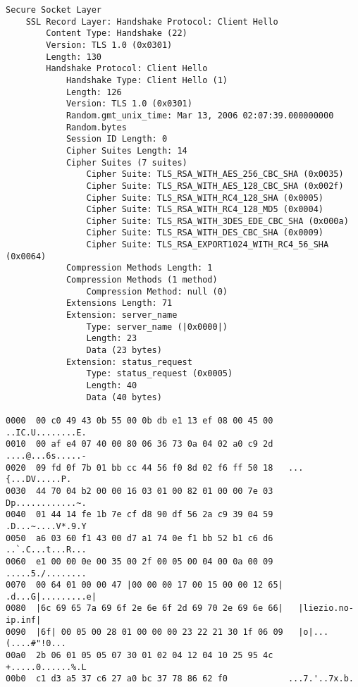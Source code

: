 \begin{lstlisting}[caption=Conexão oriunda do Opera -- Decodificação da mensagem \tlsHsCh]
Secure Socket Layer
    SSL Record Layer: Handshake Protocol: Client Hello
        Content Type: Handshake (22)
        Version: TLS 1.0 (0x0301)
        Length: 130
        Handshake Protocol: Client Hello
            Handshake Type: Client Hello (1)
            Length: 126
            Version: TLS 1.0 (0x0301)
            Random.gmt_unix_time: Mar 13, 2006 02:07:39.000000000
            Random.bytes
            Session ID Length: 0
            Cipher Suites Length: 14
            Cipher Suites (7 suites)
                Cipher Suite: TLS_RSA_WITH_AES_256_CBC_SHA (0x0035)
                Cipher Suite: TLS_RSA_WITH_AES_128_CBC_SHA (0x002f)
                Cipher Suite: TLS_RSA_WITH_RC4_128_SHA (0x0005)
                Cipher Suite: TLS_RSA_WITH_RC4_128_MD5 (0x0004)
                Cipher Suite: TLS_RSA_WITH_3DES_EDE_CBC_SHA (0x000a)
                Cipher Suite: TLS_RSA_WITH_DES_CBC_SHA (0x0009)
                Cipher Suite: TLS_RSA_EXPORT1024_WITH_RC4_56_SHA (0x0064)
            Compression Methods Length: 1
            Compression Methods (1 method)
                Compression Method: null (0)
            Extensions Length: 71
            Extension: server_name
                Type: server_name (|0x0000|)
                Length: 23
                Data (23 bytes)
            Extension: status_request
                Type: status_request (0x0005)
                Length: 40
                Data (40 bytes)

0000  00 c0 49 43 0b 55 00 0b db e1 13 ef 08 00 45 00   ..IC.U........E.
0010  00 af e4 07 40 00 80 06 36 73 0a 04 02 a0 c9 2d   ....@...6s.....-
0020  09 fd 0f 7b 01 bb cc 44 56 f0 8d 02 f6 ff 50 18   ...{...DV.....P.
0030  44 70 04 b2 00 00 16 03 01 00 82 01 00 00 7e 03   Dp............~.
0040  01 44 14 fe 1b 7e cf d8 90 df 56 2a c9 39 04 59   .D...~....V*.9.Y
0050  a6 03 60 f1 43 00 d7 a1 74 0e f1 bb 52 b1 c6 d6   ..`.C...t...R...
0060  e1 00 00 0e 00 35 00 2f 00 05 00 04 00 0a 00 09   .....5./........
0070  00 64 01 00 00 47 |00 00 00 17 00 15 00 00 12 65|   .d...G|.........e|
0080  |6c 69 65 7a 69 6f 2e 6e 6f 2d 69 70 2e 69 6e 66|   |liezio.no-ip.inf|
0090  |6f| 00 05 00 28 01 00 00 00 23 22 21 30 1f 06 09   |o|...(....#"!0...
00a0  2b 06 01 05 05 07 30 01 02 04 12 04 10 25 95 4c   +.....0......%.L
00b0  c1 d3 a5 37 c6 27 a0 bc 37 78 86 62 f0            ...7.'..7x.b.
\end{lstlisting}


